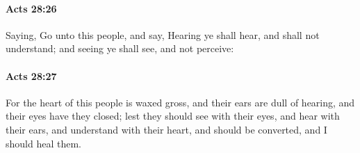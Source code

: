 		\paragraph{Acts 28:26} %
			\label{ACTS-28-26}

			Saying, Go unto this people, and say, Hearing ye shall hear, and shall not understand; and seeing ye shall see, and not perceive:

			\begin{framed}
			\scriptsize
				\begin{compactdesc}
					\item[SBLG] 
				\end{compactdesc}
			\end{framed}

		\paragraph{Acts 28:27} %
			\label{ACTS-28-27}

			For the heart of this people is waxed gross, and their ears are dull of hearing, and their eyes have they closed; lest they should see with their eyes, and hear with their ears, and understand with their heart, and should be converted, and I should heal them.

